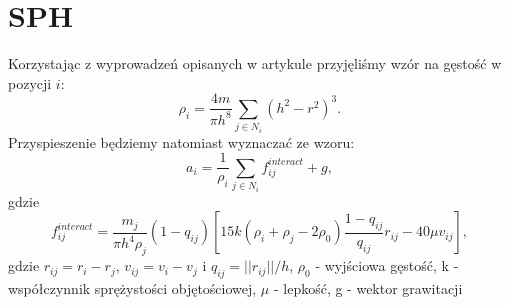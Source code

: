 \section{SPH}
Korzystając z wyprowadzeń opisanych w artykule \cite{website:derive} przyjęliśmy wzór na gęstość w pozycji $i$:
\[ \rho_i = \frac{4m}{\pi h^8} \sum\limits_{j\in N_i} (h^2-r^2)^3.\]
Przyspieszenie będziemy natomiast wyznaczać ze wzoru:
\[ a_i = \frac{1}{\rho_i} \sum\limits_{j\in N_i } f_{ij}^{interact} + g ,\]
gdzie
\[ f_{ij}^{interact} = \frac{m_j}{\pi h^4 \rho_j} (1-q_{ij})\left[15k(\rho_i+\rho_j-2\rho_0) 
\frac{1-q_{ij}}{q_{ij}} r_{ij} - 40\mu v_{ij} \right] ,\]
gdzie $r_{ij} = r_i - r_j$, $v_{ij} = v_i - v_j$ i $q_{ij} = || r_{ij} || /h$, $\rho_0$ - wyjściowa gęstość, k - współczynnik sprężystości objętościowej, $\mu$ - lepkość, g - wektor grawitacji
